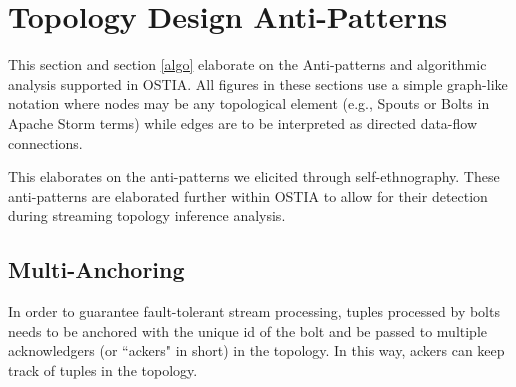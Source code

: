 \section{Topology Design Anti-Patterns}

This section and section \ref{algo} elaborate on the Anti-patterns and algorithmic analysis supported in OSTIA. All figures in these sections use a simple graph-like notation where nodes may be any topological element (e.g., Spouts or Bolts in Apache Storm terms) while edges are to be interpreted as directed data-flow connections.

\label{sec:anti-pattern}
This elaborates on the anti-patterns we elicited through self-ethnography. These anti-patterns are elaborated further within OSTIA to allow for their detection during streaming topology inference analysis.

\subsection{Multi-Anchoring}
In order to guarantee fault-tolerant stream processing, tuples processed by bolts needs to be anchored with the unique id of the bolt and be passed to multiple acknowledgers (or ``ackers" in short) in the topology. In this way, ackers can keep track of tuples in the topology.\\


\begin{figure}
\centering 
{}\label{fig:multi-anchoring}
\hspace{1cm}
\label{fig:cycle}
\end{figure}


